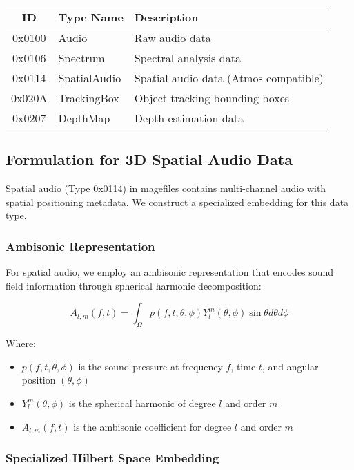 \begin{center}
\begin{tabular}{|c|l|l|}
\hline
\textbf{ID} & \textbf{Type Name} & \textbf{Description} \\
\hline
0x0100 & Audio & Raw audio data \\
0x0106 & Spectrum & Spectral analysis data \\
0x0114 & SpatialAudio & Spatial audio data (Atmos compatible) \\
0x020A & TrackingBox & Object tracking bounding boxes \\
0x0207 & DepthMap & Depth estimation data \\
\hline
\end{tabular}
\end{center}

\subsection{Formulation for 3D Spatial Audio Data}

Spatial audio (Type 0x0114) in magefiles contains multi-channel audio with spatial positioning metadata. We construct a specialized embedding for this data type.

\subsubsection{Ambisonic Representation}

For spatial audio, we employ an ambisonic representation that encodes sound field information through spherical harmonic decomposition:

\begin{equation}
A_{l,m}(f,t) = \int_{\Omega} p(f,t,\theta,\phi) Y_l^m(\theta,\phi) \sin\theta d\theta d\phi
\end{equation}

Where:
\begin{itemize}
\item $p(f,t,\theta,\phi)$ is the sound pressure at frequency $f$, time $t$, and angular position $(\theta,\phi)$
\item $Y_l^m(\theta,\phi)$ is the spherical harmonic of degree $l$ and order $m$
\item $A_{l,m}(f,t)$ is the ambisonic coefficient for degree $l$ and order $m$
\end{itemize}

\subsubsection{Specialized Hilbert Space Embedding}

